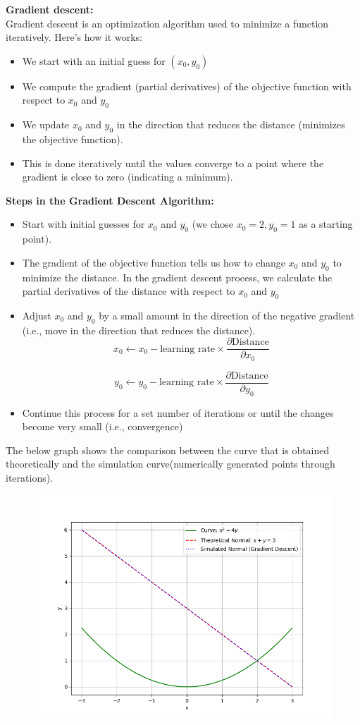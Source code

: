 \documentclass[journal]{IEEEtran}
\begin{document}
\begin{enumerate}
    \textbf{Gradient descent: }\\Gradient descent is an optimization algorithm used to minimize a function iteratively. Here's how it works:\begin{itemize}
        \item We start with an initial guess for $(x_0,y_0)$
        \item We compute the gradient (partial derivatives) of the objective function with respect to $x_0$ and $y_0$
        \item We update $x_0$ and $y_0$ in the direction that reduces the distance (minimizes the objective function).
        \item This is done iteratively until the values converge to a point where the gradient is close to zero (indicating a minimum).
    \end{itemize}
\textbf{Steps in the Gradient Descent Algorithm:}
    \begin{itemize}
        \item Start with initial guesses for $x_0$ and $y_0$ (we chose $x_0=2, y_0=1$ as a starting point).
        \item The gradient of the objective function tells us how to change $x_0$ and $y_0$ to minimize the distance. In the gradient descent process, we calculate the partial derivatives of the distance with respect to $x_0$ and $y_0$
        \item  Adjust $x_0$ and $y_0$ by a small amount in the direction of the negative gradient (i.e., move in the direction that reduces the distance).
        \[
x_0 \leftarrow x_0 - \text{learning rate} \times \frac{\partial \text{Distance}}{\partial x_0}
\]

\[
y_0 \leftarrow y_0 - \text{learning rate} \times \frac{\partial \text{Distance}}{\partial y_0}
\]
\item Continue this process for a set number of iterations or until the changes become very small (i.e., convergence)
\end{itemize} The below graph shows the comparison between the curve that is obtained theoretically and the simulation curve(numerically generated points through iterations).
\end{enumerate}
\begin{figure}[htbp]
  \centering
  \includegraphics[width=\columnwidth]{figs/curve.png}
\end{figure}
\end{document}
